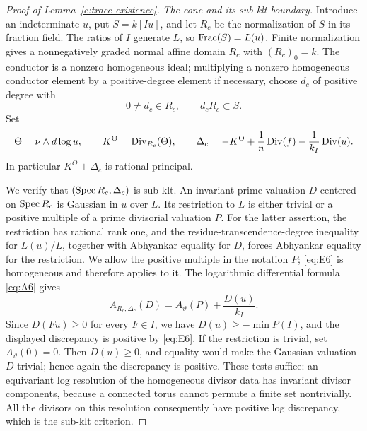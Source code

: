 \begin{proof}[Proof of Lemma~\ref{c:trace-existence}]
\emph{The cone and its sub-klt boundary.}
Introduce an indeterminate $u$, put $S=k[Iu]$, and let $R_c$ be the
normalization of $S$ in its fraction field.  The ratios of $I$ generate $L$,
so $\operatorname{Frac}(S)=L(u)$.  Finite normalization gives a nonnegatively graded
normal affine domain $R_c$ with $(R_c)_0=k$.  The conductor is a nonzero
homogeneous ideal; multiplying a nonzero homogeneous conductor element by
a positive-degree element if necessary, choose $d_c$ of positive degree
with
\[
 0\ne d_c\in R_c,\qquad d_cR_c\subset S.
\]
Set
\[
 \Theta=\nu\wedge d\log u,\qquad
 K^\Theta=\operatorname{Div}_{R_c}(\Theta),\qquad
 \Delta_c=-K^\Theta+\frac1n\operatorname{Div}(f)-\frac1{k_I}\operatorname{Div}(u).
\]
In particular $K^\Theta+\Delta_c$ is rational-principal.

We verify that $(\operatorname{Spec} R_c,\Delta_c)$ is sub-klt.  An invariant prime
valuation $D$ centered on $\operatorname{Spec} R_c$ is Gaussian in $u$ over $L$.
Its restriction to $L$ is either trivial or a positive multiple of a prime
divisorial valuation $P$.  For the latter assertion, the restriction has
rational rank one, and the residue-transcendence-degree inequality for
$L(u)/L$, together with Abhyankar equality for $D$, forces Abhyankar
equality for the restriction.  We allow the positive multiple in the
notation $P$; \eqref{eq:E6} is homogeneous and therefore applies to it.
The logarithmic differential formula \eqref{eq:A6} gives
\[
 A_{R_c,\Delta_c}(D)=A_\vartheta(P)+\frac{D(u)}{k_I}.
\]
Since $D(Fu)\ge0$ for every $F\in I$, we have
$D(u)\ge-\min P(I)$, and the displayed discrepancy is positive by
\eqref{eq:E6}.  If the restriction is trivial, set $A_\vartheta(0)=0$.
Then $D(u)\ge0$, and equality would make the Gaussian valuation $D$
trivial; hence again the discrepancy is positive.  These tests suffice:
an equivariant log resolution of the homogeneous divisor data has invariant
divisor components, because a connected torus cannot permute a finite set
nontrivially.  All the divisors on this resolution consequently have
positive log discrepancy, which is the sub-klt criterion.


\end{proof}
